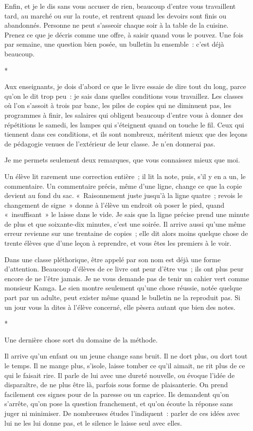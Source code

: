 \documentclass[10.5pt,twoside,openright]{book}
\newcommand{\asterisme}{\par\vspace{0.7em}\centerline{\color{gris}*\quad*\quad*}\vspace{0.7em}\par\noindent}
\begin{document}
Enfin, et je le dis sans vous accuser de rien, beaucoup d’entre vous travaillent tard, au marché ou sur la route, et rentrent quand les devoirs sont finis ou abandonnés. Personne ne peut s’asseoir chaque soir à la table de la cuisine. Prenez ce que je décris comme une offre, à saisir quand vous le pouvez. Une fois par semaine, une question bien posée, un bulletin lu ensemble : c’est déjà beaucoup.

\asterisme

Aux enseignants, je dois d’abord ce que le livre essaie de dire tout du long, parce qu’on le dit trop peu : je sais dans quelles conditions vous travaillez. Les classes où l’on s’assoit à trois par banc, les piles de copies qui ne diminuent pas, les programmes à finir, les salaires qui obligent beaucoup d’entre vous à donner des répétitions le samedi, les lampes qui s’éteignent quand on touche le fil. Ceux qui tiennent dans ces conditions, et ils sont nombreux, méritent mieux que des leçons de pédagogie venues de l’extérieur de leur classe. Je n’en donnerai pas.

Je me permets seulement deux remarques, que vous connaissez mieux que moi.

Un élève lit rarement une correction entière ; il lit la note, puis, s’il y en a un, le commentaire. Un commentaire précis, même d’une ligne, change ce que la copie devient au fond du sac. « Raisonnement juste jusqu’à la ligne quatre ; revois le changement de signe » donne à l’élève un endroit où poser le pied, quand « insuffisant » le laisse dans le vide. Je sais que la ligne précise prend une minute de plus et que soixante-dix minutes, c’est une soirée. Il arrive aussi qu’une même erreur revienne sur une trentaine de copies ; elle dit alors moins quelque chose de trente élèves que d’une leçon à reprendre, et vous êtes les premiers à le voir.

Dans une classe pléthorique, être appelé par son nom est déjà une forme d’attention. Beaucoup d’élèves de ce livre ont peur d’être vus ; ils ont plus peur encore de ne l’être jamais. Je ne vous demande pas de tenir un cahier vert comme monsieur Kamga. Le sien montre seulement qu’une chose réussie, notée quelque part par un adulte, peut exister même quand le bulletin ne la reproduit pas. Si un jour vous la dites à l’élève concerné, elle pèsera autant que bien des notes.

\asterisme

Une dernière chose sort du domaine de la méthode.

Il arrive qu’un enfant ou un jeune change sans bruit. Il ne dort plus, ou dort tout le temps. Il ne mange plus, s’isole, laisse tomber ce qu’il aimait, ne rit plus de ce qui le faisait rire. Il parle de lui avec une dureté nouvelle, ou évoque l’idée de disparaître, de ne plus être là, parfois sous forme de plaisanterie. On prend facilement ces signes pour de la paresse ou un caprice. Ils demandent qu’on s’arrête, qu’on pose la question franchement, et qu’on écoute la réponse sans juger ni minimiser. De nombreuses études l’indiquent : parler de ces idées avec lui ne les lui donne pas, et le silence le laisse seul avec elles.
\end{document}
